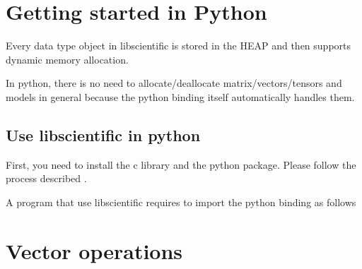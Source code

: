 \documentclass[letterpaper,10pt,english]{sphinxmanual}
\begin{document}
\begin{sphinxVerbatim}[commandchars=\\\{\},numbers=left,firstnumber=1,stepnumber=1]

\end{sphinxVerbatim}

\sphinxstepscope


\chapter{Getting started in Python}
\label{\detokenize{GettingStartedInPython:getting-started-in-python}}\label{\detokenize{GettingStartedInPython::doc}}
\sphinxAtStartPar
Every data type object in libscientific is stored in the HEAP and then supports dynamic memory allocation.

\sphinxAtStartPar
In python, there is no need to allocate/deallocate matrix/vectors/tensors and models in general
because the python binding itself automatically handles them.


\section{Use libscientific in python}
\label{\detokenize{GettingStartedInPython:use-libscientific-in-python}}
\sphinxAtStartPar
First, you need to install the c library and the python package.
Please follow the process described .

\sphinxAtStartPar
A program that use libscientific requires to import the python binding as follows

\begin{sphinxVerbatim}[commandchars=\\\{\},numbers=left,firstnumber=1,stepnumber=1]
 
\end{sphinxVerbatim}


\chapter{Vector operations}
\label{\detokenize{GettingStartedInPython:vector-operations}}
\end{document}
